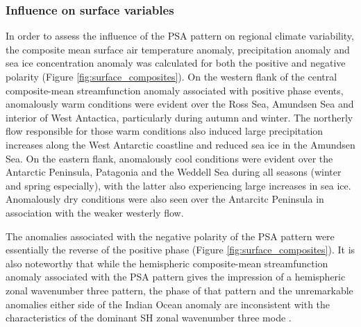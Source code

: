 \subsubsection{Influence on surface variables} 

In order to assess the influence of the PSA pattern on regional climate variability, the composite mean surface air temperature anomaly, precipitation anomaly and sea ice concentration anomaly was calculated for both the positive and negative polarity (Figure \ref{fig:surface_composites}). On the western flank of the central composite-mean streamfunction anomaly associated with positive phase events, anomalously warm conditions were evident over the Ross Sea, Amundsen Sea and interior of West Antactica, particularly during autumn and winter. The northerly flow responsible for those warm conditions also induced large precipitation increases along the West Antarctic coastline and reduced sea ice in the Amundsen Sea. On the eastern flank, anomalously cool conditions were evident over the Antarctic Peninsula, Patagonia and the Weddell Sea during all seasons (winter and spring especially), with the latter also experiencing large increases in sea ice. Anomalously dry conditions were also seen over the Antarcitc Peninsula in association with the weaker westerly flow. 

The anomalies associated with the negative polarity of the PSA pattern were essentially the reverse of the positive phase (Figure \ref{fig:surface_composites}). It is also noteworthy that while the hemispheric composite-mean streamfunction anomaly associated with the PSA pattern gives the impression of a hemispheric zonal wavenumber three pattern, the phase of that pattern and the unremarkable anomalies either side of the Indian Ocean anomaly are inconsistent with the characteristics of the dominant SH zonal wavenumber three mode \citep[e.g.][]{Raphael2004,IrvingSimmonds2015}.


